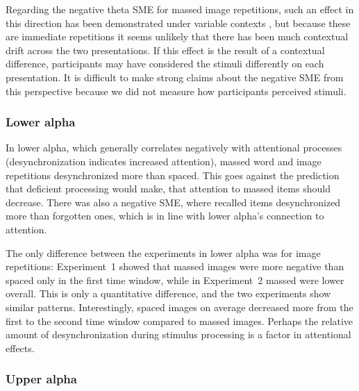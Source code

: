 

Regarding the negative theta SME for massed image repetitions, such an effect in this direction has been demonstrated under variable contexts \cite{StauHans2013}, but because these are immediate repetitions it seems unlikely that there has been much contextual drift across the two presentations.  If this effect is the result of a contextual difference, participants may have considered the stimuli differently on each presentation.  It is difficult to make strong claims about the negative SME from this perspective because we did not measure how participants perceived stimuli.

\subsubsection{Lower alpha}

In lower alpha, which generally correlates negatively with attentional processes (desynchronization indicates increased attention), massed word and image repetitions desynchronized more than spaced.  This goes against the prediction that deficient processing would make, that attention to massed items should decrease.  There was also a negative SME, where recalled items desynchronized more than forgotten ones, which is in line with lower alpha's connection to attention.

The only difference between the experiments in lower alpha was for image repetitions: Experiment~1 showed that massed images were more negative than spaced only in the first time window, while in Experiment~2 massed were lower overall.  This is only a quantitative difference, and the two experiments show similar patterns.  Interestingly, spaced images on average decreased more from the first to the second time window compared to massed images.  Perhaps the relative amount of desynchronization during stimulus processing is a factor in attentional effects.

\subsubsection{Upper alpha}

